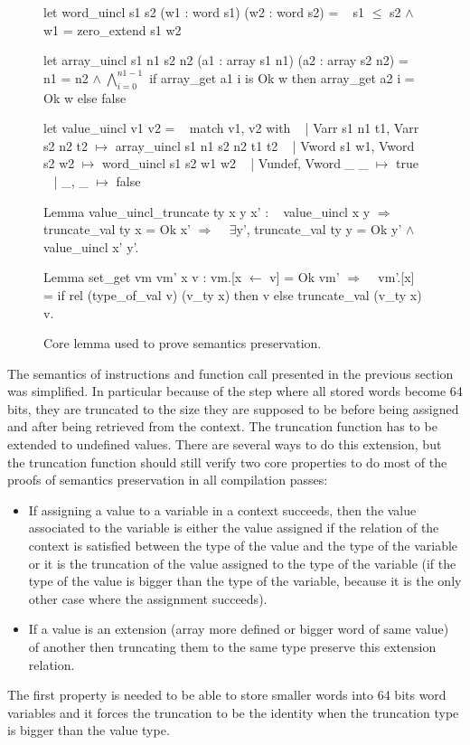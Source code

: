 \documentclass{article}
\begin{document}
\begin{figure}[t]
\obeylines\obeyspaces\ttfamily%
let word\_uincl s1 s2 (w1 : word s1) (w2 : word s2) =
~ s1 \(\leq\) s2 \(\wedge\) w1 = zero\_extend s1 w2

let array\_uincl s1 n1 s2 n2 (a1 : array s1 n1) (a2 : array s2 n2) =
~ n1 = n2 \(\wedge\;\bigwedge_{i = 0}^{n1 - 1}\) if array\_get a1 i is Ok w then array\_get a2 i = Ok w else false

let value\_uincl v1 v2 =
~ match v1, v2 with
~ | Varr s1 n1 t1, Varr s2 n2 t2 \(\mapsto\) array\_uincl s1 n1 s2 n2 t1 t2
~ | Vword s1 w1,   Vword s2 w2   \(\mapsto\) word\_uincl s1 s2 w1 w2
~ | Vundef,        Vword \_ \_     \(\mapsto\) true
~ | \_,             \_             \(\mapsto\) false

Lemma value\_uincl\_truncate ty x y x' :
~ value\_uincl x y \(\Longrightarrow\) truncate\_val ty x = Ok x' \(\Longrightarrow\)
~ \(\exists\)y', truncate\_val ty y = Ok y' \(\wedge\) value\_uincl x' y'.

Lemma set\_get vm vm' x v : vm.[x \(\gets\) v] = Ok vm' \(\Longrightarrow\)
~ vm'.[x] = if rel (type\_of\_val v) (v\_ty x) then v else truncate\_val (v\_ty x) v.
\normalfont%
\caption{Core lemma used to prove semantics preservation.}
\end{figure}

The semantics of instructions and function call presented in the previous section
was simplified. In particular because of the step where all stored words become
64 bits, they are truncated to the size they are supposed to be before being
assigned and after being retrieved from the context. The truncation function
has to be extended to undefined values. There are several ways to do this
extension, but the truncation function should still verify two core properties
to do most of the proofs of semantics preservation in all compilation passes:
\begin{itemize}
\item If assigning a value to a variable in a context succeeds, then the value
  associated to the variable is either the value assigned if the relation of the
  context is satisfied between the type of the value and the type of the
  variable or it is the truncation of the value assigned to the type of the
  variable (if the type of the value is bigger than the type of the variable,
  because it is the only other case where the assignment succeeds).
\item If a value is an extension (array more defined or bigger word of same
  value) of another then truncating them to the same type preserve this
  extension relation.
\end{itemize}
The first property is needed to be able to store smaller words into 64 bits word
variables and it forces the truncation to be the identity when the truncation
type is bigger than the value type.
\end{document}
